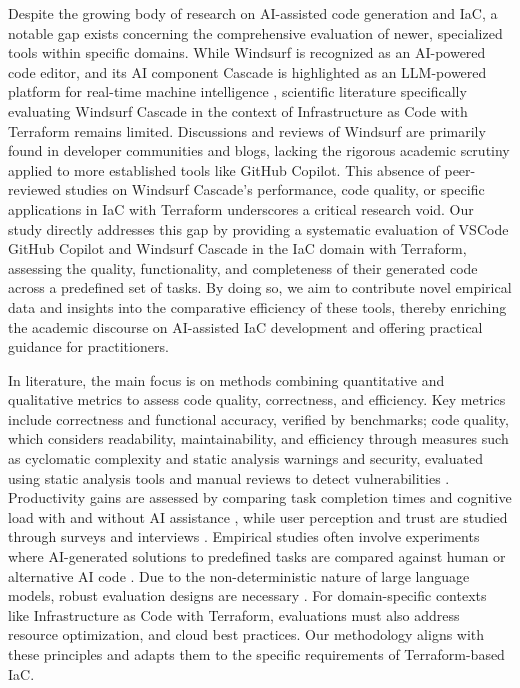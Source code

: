 Despite the growing body of research on AI-assisted code generation and IaC, a notable gap exists concerning the comprehensive evaluation of newer, specialized tools within specific domains. While Windsurf is recognized as an AI-powered code editor, and its AI component Cascade is highlighted as an LLM-powered platform for real-time machine intelligence \cite{sewell_windsurf_2024, hofferber_my_2024, windsurf_editor, manuskhani_cascade_2024}, scientific literature specifically evaluating Windsurf Cascade in the context of Infrastructure as Code with Terraform remains limited. Discussions and reviews of Windsurf are primarily found in developer communities and blogs, lacking the rigorous academic scrutiny applied to more established tools like GitHub Copilot. This absence of peer-reviewed studies on Windsurf Cascade's performance, code quality, or specific applications in IaC with Terraform underscores a critical research void. Our study directly addresses this gap by providing a systematic evaluation of VSCode GitHub Copilot and Windsurf Cascade in the IaC domain with Terraform, assessing the quality, functionality, and completeness of their generated code across a predefined set of tasks. By doing so, we aim to contribute novel empirical data and insights into the comparative efficiency of these tools, thereby enriching the academic discourse on AI-assisted IaC development and offering practical guidance for practitioners.

In literature, the main focus is on methods combining quantitative and qualitative metrics to assess code quality, correctness, and efficiency. Key metrics include correctness and functional accuracy, verified by benchmarks; code quality, which considers readability, maintainability, and efficiency through measures such as cyclomatic complexity and static analysis warnings and security, evaluated using static analysis tools and manual reviews to detect vulnerabilities \cite{sabra2025assessingqualitysecurityaigenerated}. Productivity gains are assessed by comparing task completion times and cognitive load with and without AI assistance \cite{hendrich_research_2024}, while user perception and trust are studied through surveys and interviews \cite{10685197}. Empirical studies often involve experiments where AI-generated solutions to predefined tasks are compared against human or alternative AI code \cite{10825958}. Due to the non-deterministic nature of large language models, robust evaluation designs are necessary \cite{10.1145/3697010}. For domain-specific contexts like Infrastructure as Code with Terraform, evaluations must also address resource optimization, and cloud best practices. Our methodology aligns with these principles and adapts them to the specific requirements of Terraform-based IaC.